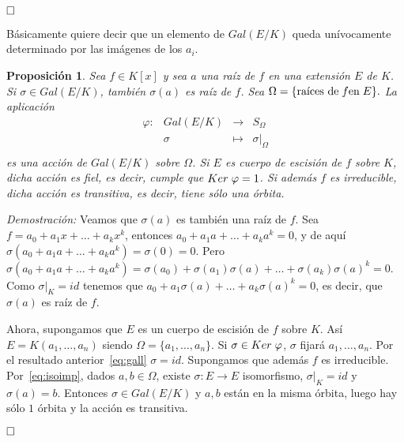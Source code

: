 \documentclass[12pt]{article}
\newtheorem{proposition}[theorem]{Proposición}
\begin{document}
$\hfill \square$

Básicamente quiere decir que un elemento de $Gal(E/K)$ queda unívocamente determinado por las imágenes de los $a_{i}$.

\begin{proposition}\label{eq:accgal} Sea $f \in K[x]$ y sea $a$ una raíz de $f$ en una extensión $E$ de $K$. Si $\sigma \in Gal(E/K)$, también $\sigma (a)$ es raíz de $f$. Sea $\Omega = \lbrace \text{raíces de} \hspace{0.1cm} f \text{en} \hspace{0.1cm} E \rbrace. $ La aplicación  $$\begin{array}{rccl}
\varphi \colon &Gal(E/K)&\longrightarrow &S_{\Omega} \\
&\sigma& \longmapsto &\left.\sigma \right|_\Omega \\
\end{array}
$$ es una acción de $Gal(E/K)$ sobre $\Omega$. Si $E$ es cuerpo de escisión de $f$ sobre $K$, dicha acción es fiel, es decir, cumple que $Ker \hspace{0.1cm} \varphi = 1$. Si además $f$ es irreducible, dicha acción es transitiva, es decir, tiene sólo una órbita.
\end{proposition}
\emph{Demostración: }
Veamos que $\sigma(a)$ es también una raíz de $f$. Sea $f = a_{0}+a_{1}x+ \ldots + a_{k}x^{k}$, entonces $a_{0}+a_{1}a+ \ldots + a_{k}a^{k} =0$, y de aquí $\sigma(a_{0}+a_{1}a+ \ldots + a_{k}a^{k}) =\sigma(0) = 0$. Pero  $\sigma(a_{0}+a_{1}a+ \ldots + a_{k}a^{k}) =  \sigma(a_{0})+\sigma(a_{1})\sigma(a)+ \ldots + \sigma(a_{k})\sigma(a)^{k} = 0$. Como $\left.\sigma \right|_K = id$ tenemos que $a_{0}+a_{1}\sigma(a)+ \ldots + a_{k}\sigma(a)^{k} = 0$, es decir, que $\sigma(a)$ es raíz de $f$.

Ahora, supongamos que $E$ es un cuerpo de escisión de $f$ sobre $K$. Así $E = K(a_{1}, \ldots, a_{n})$ siendo $\Omega = \lbrace a_{1}, \ldots, a_{n} \rbrace$. Si $\sigma \in Ker \hspace{0.1cm} \varphi$, $\sigma$ fijará $a_{1}, \ldots, a_{n}$. Por el resultado anterior~\ref{eq:gall} $\sigma = id$. Supongamos que además $f$ es irreducible. Por~\ref{eq:isoimp}, dados $a,b \in \Omega$, existe $\sigma \colon E \longrightarrow E$ isomorfismo, $\left.\sigma \right|_K = id$ y $\sigma (a) = b$. Entonces $\sigma \in Gal(E/K)$ y $a,b$ están en la misma órbita, luego hay sólo $1$ órbita y la acción es transitiva.

$\hfill \square$
\end{document}
